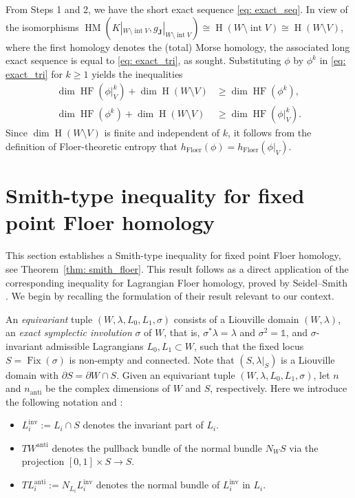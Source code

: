 \documentclass[12pt]{article}
\renewcommand{\ge}{\geqslant}
\theoremstyle{theorem}
\theoremstyle{definition}
\theoremstyle{remark}
\numberwithin{equation}{section}
\newcommand{\p}{\partial}
\DeclareMathOperator{\floer}{Floer}
\DeclareMathOperator{\anti}{anti}
\DeclareMathOperator{\inv}{inv}
\DeclareMathOperator{\Fix}{Fix}
\DeclareMathOperator{\HF}{HF}
\DeclareMathOperator{\HM}{HM}
\DeclareMathOperator{\Ho}{H}
\DeclareMathOperator{\Int}{int}
\begin{document}
From Steps 1 and 2, we have the short exact sequence \eqref{eq: exact_seq}.
In view of the isomorphisms $\HM(K|_{W\setminus \Int V},g_{\bm{J}}|_{W\setminus \Int V})\cong \Ho(W\setminus \Int V)\cong \Ho(W\setminus V)$, where the first homology denotes the (total) Morse homology, the associated long exact sequence is equal to \eqref{eq: exact_tri}, as sought.
Substituting $\phi$ by $\phi^k$ in \eqref{eq: exact_tri} for $k\ge 1$ yields the inequalities
\begin{equation}\label{eq: rankest}
	\begin{split}
	\dim \HF(\phi|_V^k) + \dim \Ho(W\setminus V) &\ge \dim \HF(\phi^k),\\
	\dim \HF(\phi^k) + \dim \Ho(W\setminus V) &\ge \dim \HF(\phi|_V^k).	
\end{split}
\end{equation}
Since $\dim \Ho(W\setminus V)$ is finite and independent of $k$, it follows from the definition of Floer-theoretic entropy that $h_{\floer}(\phi) = h_{\floer}(\phi|_V)$.

\section{Smith-type inequality for fixed point Floer homology}\label{sec: smith_ineq}
This section establishes a Smith-type inequality for fixed point Floer homology, see Theorem~\ref{thm: smith_floer}.
This result follows as a direct application of the corresponding inequality for Lagrangian Floer homology, proved by Seidel--Smith \cite{SS}.
We begin by recalling the formulation of their result relevant to our context.

An \emph{equivariant} tuple $(W,\lambda,L_0,L_1,\sigma)$ consists of a Liouville domain $(W,\lambda)$, an \emph{exact symplectic involution} $\sigma$ of $W$, that is, $\sigma^*\lambda=\lambda$ and $\sigma^2=\mathds{1}$, and $\sigma$-invariant admissible Lagrangians $L_0,L_1\subset W$, such that the fixed locus $S=\Fix(\sigma)$ is non-empty and connected.
Note that $(S,\lambda|_S)$ is a Liouville domain with $\p S= \p W\cap S$.
Given an equivariant tuple $(W,\lambda,L_0,L_1,\sigma)$, let $n$ and $n_{\anti}$ be the complex dimensions of $W$ and $S$, respectively.
Here we introduce the following notation and \cite[Definition 18]{SS}:
\begin{itemize}
	\item $L^{\inv}_i:=L_i\cap S$ denotes the invariant part of $L_i$.
	\item $TW^{\anti}$ denotes the pullback bundle of the normal bundle $N_WS$ via the projection $[0,1]\times S\to S$.
	\item $TL_i^{\anti}:=N_{L_i}L_i^{\inv}$ denotes the normal bundle of $L_i^{\inv}$ in $L_i$.
\end{itemize}
\end{document}
